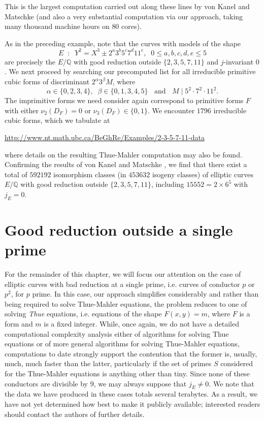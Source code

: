 This is the largest computation carried out along these lines by von Kanel and Matschke \cite{KanMat} (and also a very substantial computation via our approach, 
taking many thousand machine hours on $80$ cores).

As in the preceding example, note that
the curves with models of the shape
$$
E \; \; : \; \; Y^2 = X^3 \pm 2^a 3^b 5^c 7^d 11^e, \; \; 0 \leq a, b, c, d, e \leq 5
$$
are precisely the $E/\mathbb{Q}$  with good reduction outside $\{ 2, 3, 5, 7, 11 \}$ and $j$-invariant $0$. We next proceed  by searching our precomputed list for all irreducible primitive cubic forms of discriminant $2^{\alpha} 3^\beta M$,
where 
$$
\alpha \in \{ 0, 2, 3, 4 \}, \; \; \beta \in \{ 0, 1, 3, 4, 5 \} \; \; \mbox{ and } \; \; M \mid 5^2 \cdot 7^2 \cdot 11^2. 
$$
The imprimitive forms we need consider again correspond to primitive 
forms $F$ with either $\nu_2 (D_F) = 0$ or $\nu_3 (D_F) \in \{ 0, 1 \}$.
We encounter $1796$ irreducible cubic forms, which we tabulate at 
\begin{center}
\url{http://www.nt.math.ubc.ca/BeGhRe/Examples/2-3-5-7-11-data}
\end{center}
where details on the resulting Thue-Mahler computation may also be found. Confirming the results of von Kanel and Matschke \cite{KanMat}, we find that there exist a total of $592192$ isomorphism classes (in $453632$ isogeny classes) of elliptic curves $E/\mathbb{Q}$ with good reduction outside $\{ 2, 3, 5, 7, 11\}$, including $15552=2 \times 6^5$ with $j_E=0$.


\section{Good reduction outside a single prime} \label{primes}

For the remainder of this chapter, we will focus our attention on the case of elliptic curves with bad reduction at a single prime, i.e. curves of conductor $p$ or $p^2$, for $p$ prime.
In this case, our approach simplifies considerably and 
rather than being required to solve Thue-Mahler equations, the problem reduces to one of solving \emph{Thue} equations, i.e. equations of the shape $F(x,y)=m$, where $F$ is a form and $m$ is a fixed integer. While, once again, we do not have a detailed computational complexity analysis either of algorithms for solving Thue equations or of more general algorithms for solving Thue-Mahler equations, computations to date strongly support the contention that the former is, usually, much, much faster than the latter, particularly if the set of primes $S$ considered for the Thue-Mahler equations is anything other than tiny. Since none of these conductors are divisible by $9$, we may always suppose that $j_E \neq 0$. We note that the data we have produced in these cases totals several terabytes. As a result, we have not yet determined how best to make it publicly available; interested readers should contact the authors of \cite{BeGhRe} further details.

